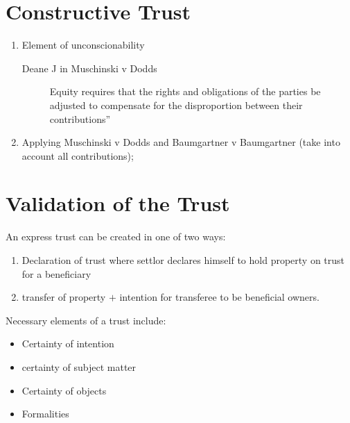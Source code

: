 \section*{Constructive Trust}
\begin{enumerate}
    \item Element of unconscionability
        \begin{description}
            \item[Deane J in Muschinski v Dodds]Equity requires that the rights and obligations of the parties be adjusted to compensate for the disproportion between their contributions”
        \end{description}
    \item Applying Muschinski v Dodds and Baumgartner v Baumgartner (take into account all contributions);
\end{enumerate}

\section*{Validation of the Trust}
An express trust can be created in one of two ways:
\begin{enumerate}
    \item Declaration of trust where settlor declares himself to hold property on trust for a beneficiary
    \item transfer of property $+$ intention for transferee to be beneficial owners.
\end{enumerate}
Necessary elements of a trust include:
\begin{itemize}
    \item Certainty of intention
    \item certainty of subject matter
    \item Certainty of objects
    \item Formalities
\end{itemize}

